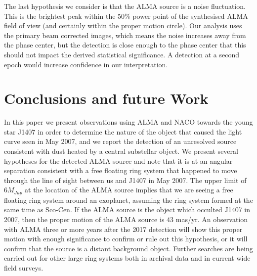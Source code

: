 \documentclass[twocolumn]{aa} %
\begin{document}
The last hypothesis we consider is that the ALMA source is a noise fluctuation.
%
This is the brightest peak within the 50\% power point of the synthesised ALMA field of view (and certainly within the proper motion circle).
%
Our analysis uses the primary beam corrected images, which means the noise increases away from the phase center, but the detection is close enough to the phase center that this should not impact the derived statistical significance.
%
A detection at a second epoch would increase confidence in our interpretation.

\section{Conclusions and future Work}\label{concl} %

In this paper we present observations using ALMA and NACO towards the young star J1407 in order to determine the nature of the object that caused the light curve seen in May 2007, and we report the detection of an unresolved source consistent with dust heated by a central substellar object.
%
We present several hypotheses for the detected ALMA source and note that it is at an angular separation consistent with a free floating ring system that happened to move through the line of sight between us and J1407 in May 2007.
%
The upper limit of $6M_{Jup}$ at the location of the ALMA source implies that we are seeing a free floating ring system around an exoplanet, assuming the ring system formed at the same time as Sco-Cen.
%
If the ALMA source is the object which occulted J1407 in 2007, then the proper motion of the ALMA source is $43$ mas/yr. 
%
An observation with ALMA three or more years after the 2017 detection will show this proper motion with enough significance to confirm or rule out this hypothesis, or it will confirm that the source is a distant background object.
%
Further searches are being carried out for other large ring systems both in archival data and in current wide field surveys.
\end{document}

